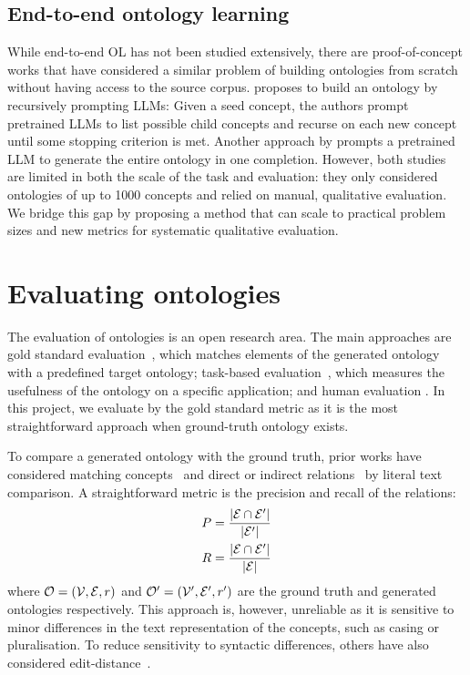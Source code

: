 \subsection{End-to-end ontology learning}

While end-to-end OL has not been studied extensively, there are proof-of-concept works that have considered a similar problem of building ontologies from scratch without having access to the source corpus. \citet{funk2023towards} proposes to build an ontology by recursively prompting LLMs: Given a seed concept, the authors prompt pretrained LLMs to list possible child concepts and recurse on each new concept until some stopping criterion is met. Another approach by \citet{trajanoska2023enhancing} prompts a pretrained LLM to generate the entire ontology in one completion. However, both studies are limited in both the scale of the task and evaluation: they only considered ontologies of up to 1000 concepts and relied on manual, qualitative evaluation. We bridge this gap by proposing a method that can scale to practical problem sizes and new metrics for systematic qualitative evaluation.

\section{Evaluating ontologies}  \label{sec:evaluating-ontologies}

The evaluation of ontologies is an open research area. The main approaches are gold standard evaluation~\cite{Zavitsanos2011GoldSE}, which matches elements of the generated ontology with a predefined target ontology; task-based evaluation~\cite{porzel2004task}, which measures the usefulness of the ontology on a specific application; and human evaluation \cite{raad2015survey,brank2005survey}. In this project, we evaluate by the gold standard metric as it is the most straightforward approach when ground-truth ontology exists.

To compare a generated ontology with the ground truth, prior works have considered matching concepts~\cite{maedche2002measuring} and direct or indirect relations~\cite{Kashyap2005TaxaMinerAE} by literal text comparison. A straightforward metric is the precision and recall of the relations:
\begin{align*}
    P & = \frac{|\mathcal{E} \cap \mathcal{E}'|}{|\mathcal{E}'|} \\
    R & = \frac{|\mathcal{E} \cap \mathcal{E}'|}{|\mathcal{E}|}
\end{align*}
where $\mathcal{O} = (\mathcal{V}, \mathcal{E}, r)$ and $\mathcal{O}' = (\mathcal{V}', \mathcal{E}', r')$ are the ground truth and generated ontologies respectively. This approach is, however, unreliable as it is sensitive to minor differences in the text representation of the concepts, such as casing or pluralisation. To reduce sensitivity to syntactic differences, others have also considered edit-distance~\cite{Ehrig2005SimilarityFO}.

